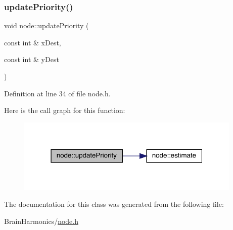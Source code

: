 \subsubsection{\texorpdfstring{update\+Priority()}{updatePriority()}}
{\footnotesize\ttfamily \mbox{\hyperlink{glad_8h_a950fc91edb4504f62f1c577bf4727c29}{void}} node\+::update\+Priority (\begin{DoxyParamCaption}\item[{const int \&}]{x\+Dest,  }\item[{const int \&}]{y\+Dest }\end{DoxyParamCaption})\hspace{0.3cm}{\ttfamily [inline]}}



Definition at line 34 of file node.\+h.

Here is the call graph for this function\+:\nopagebreak
\begin{figure}[H]
\begin{center}
\leavevmode
\includegraphics[width=304pt]{classnode_ad51b92de008bd5107a7b55cc61fc497b_cgraph}
\end{center}
\end{figure}


The documentation for this class was generated from the following file\+:\begin{DoxyCompactItemize}
\item 
Brain\+Harmonics/\mbox{\hyperlink{node_8h}{node.\+h}}\end{DoxyCompactItemize}
